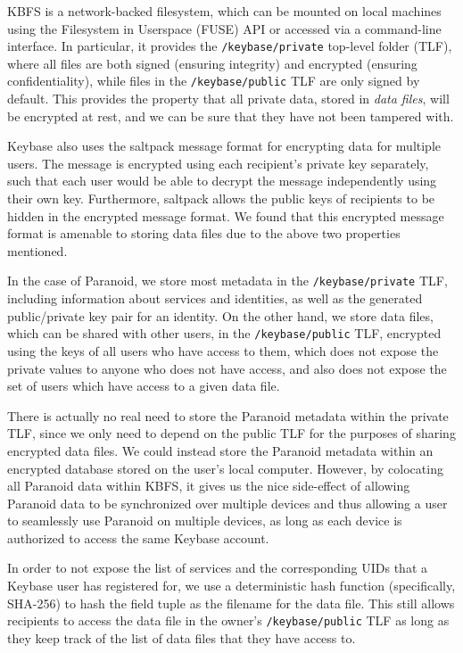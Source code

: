 \documentclass[letterpaper,twocolumn,10pt]{article}
\begin{document}
KBFS is a network-backed filesystem, which can be mounted on local machines using the Filesystem in Userspace (FUSE) API or accessed via a command-line interface. In particular, it provides the \texttt{/keybase/private} top-level folder (TLF), where all files are both signed (ensuring integrity) and encrypted (ensuring confidentiality), while files in the \texttt{/keybase/public} TLF are only signed by default. This provides the property that all private data, stored in \textit{data files}, will be encrypted at rest, and we can be sure that they have not been tampered with.

Keybase also uses the saltpack \cite{saltpack} message format for encrypting data for multiple users. The message is encrypted using each recipient's private key separately, such that each user would be able to decrypt the message independently using their own key. Furthermore, saltpack allows the public keys of recipients to be hidden in the encrypted message format. We found that this encrypted message format is amenable to storing data files due to the above two properties mentioned.

In the case of Paranoid, we store most metadata in the \texttt{/keybase/private} TLF, including information about services and identities, as well as the generated public/private key pair for an identity. On the other hand, we store data files, which can be shared with other users, in the \texttt{/keybase/public} TLF, encrypted using the keys of all users who have access to them, which does not expose the private values to anyone who does not have access, and also does not expose the set of users which have access to a given data file.

There is actually no real need to store the Paranoid metadata within the private TLF, since we only need to depend on the public TLF for the purposes of sharing encrypted data files. We could instead store the Paranoid metadata within an encrypted database stored on the user's local computer. However, by colocating all Paranoid data within KBFS, it gives us the nice side-effect of allowing Paranoid data to be synchronized over multiple devices and thus allowing a user to seamlessly use Paranoid on multiple devices, as long as each device is authorized to access the same Keybase account.

In order to not expose the list of services and the corresponding UIDs that a Keybase user has registered for, we use a deterministic hash function (specifically, SHA-256) to hash the field tuple as the filename for the data file. This still allows recipients to access the data file in the owner's \texttt{/keybase/public} TLF as long as they keep track of the list of data files that they have access to.
\end{document}
